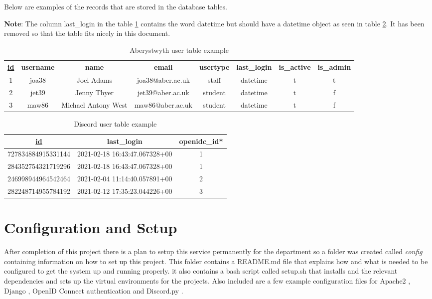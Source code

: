 Below are examples of the records that are stored in the database tables. 

\textbf{Note}: The column last\_login in the table \ref{tab:aber-table} contains the word datetime but should have a datetime object as seen in table \ref{tab:dis-table}. It has been removed so that the table fits nicely in this document.

\begin{table}[H]
	\centering
	\small
	\setlength\tabcolsep{2pt}
	\begin{tabular}{|c|c|c|c|c|c|c|c|}
		\hline
		\underline{id} & username & name & email & usertype & last\_login & is\_active & is\_admin \\
		\hline
		1 & joa38 & Joel Adams & joa38@aber.ac.uk & staff & datetime & t & t \\
		2 & jet39 & Jenny Thyer & jet39@aber.ac.uk & student & datetime & t & f \\
		3 & maw86 & Michael Antony West & maw86@aber.ac.uk & student & datetime & t & f \\
		\hline 
	\end{tabular}
	\caption{Aberystwyth user table example}
	\label{tab:aber-table}
\end{table}

\begin{table}[H]
	\centering
	\small
	\setlength\tabcolsep{2pt}
	\begin{tabular}{|c|c|c|}
		\hline
		\underline{id}                 & last\_login                   & openidc\_id* \\
		\hline
		727834884915331144 & 2021-02-18 16:43:47.067328+00 & 1           \\
		284352754321719296 & 2021-02-18 16:43:47.067328+00 & 1           \\
		246998944964542464 & 2021-02-04 11:14:40.057891+00 & 2           \\
		282248714955784192 & 2021-02-12 17:35:23.044226+00 & 3           \\
		\hline
	\end{tabular}
	\caption{Discord user table example}
	\label{tab:dis-table}
\end{table}

\section{Configuration and Setup}
After completion of this project there is a plan to setup this service permanently for the department so a folder was created called \textit{config} containing information on how to set up this project. This folder contains a README.md file that explains how and what is needed to be configured to get the system up and running properly. it also contains a bash script called setup.sh that installs and the relevant dependencies and sets up the virtual environments for the projects. Also included are a few example configuration files for Apache2 \cite{apache2}, Django \cite{Django}, OpenID Connect authentication \cite{OpenID} and Discord.py \cite{discord.py}.

